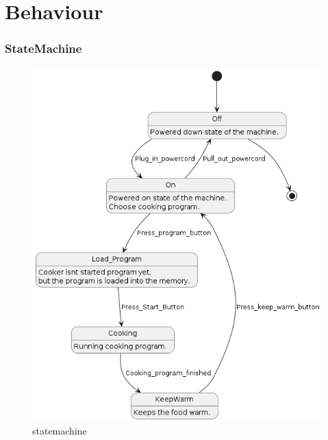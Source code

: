 \documentclass{scrartcl}
\begin{document}
\section{Behaviour}
\subsubsection{StateMachine}
\begin{figure}[H]\centering
    \includegraphics[width=1.1\columnwidth]{StateMachine.png}
    \caption{statemachine}\label{fig:3}
\end{figure}
\end{document}
